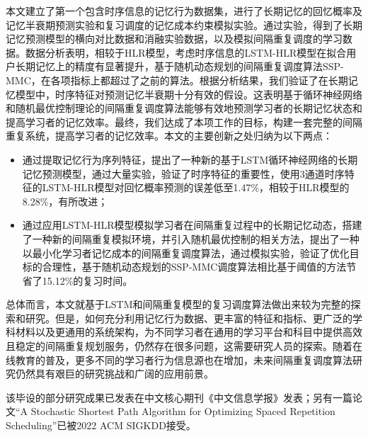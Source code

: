 \begin{conclusions}
本文建立了第一个包含时序信息的记忆行为数据集，进行了长期记忆的回忆概率及记忆半衰期预测实验和复习调度的记忆成本约束模拟实验。通过实验，得到了长期记忆预测模型的横向对比数据和消融实验数据，以及模拟间隔重复调度的学习数据。数据分析表明，相较于HLR模型，考虑时序信息的LSTM-HLR模型在拟合用户长期记忆上的精度有显著提升，基于随机动态规划的间隔重复调度算法SSP-MMC，在各项指标上都超过了之前的算法。根据分析结果，我们验证了在长期记忆模型中，时序特征对预测记忆半衰期十分有效的假设。这表明基于循环神经网络和随机最优控制理论的间隔重复调度算法能够有效地预测学习者的长期记忆状态和提高学习者的记忆效率。最终，我们达成了本项工作的目标，构建一套完整的间隔重复系统，提高学习者的记忆效率。本文的主要创新之处归纳为以下两点：
\begin{itemize}
    \item 通过提取记忆行为序列特征，提出了一种新的基于LSTM循环神经网络的长期记忆预测模型，通过大量实验，验证了时序特征的重要性，使用3通道时序特征的LSTM-HLR模型对回忆概率预测的误差低至1.47\%，相较于HLR模型的8.28\%，有所改进；
    \item 通过应用LSTM-HLR模型模拟学习者在间隔重复过程中的长期记忆动态，搭建了一种新的间隔重复模拟环境，并引入随机最优控制的相关方法，提出了一种以最小化学习者记忆成本的间隔重复调度算法，通过模拟实验，验证了优化目标的合理性，基于随机动态规划的SSP-MMC调度算法相比基于阈值的方法节省了15.12\%的复习时间。
\end{itemize}

总体而言，本文就基于LSTM和间隔重复模型的复习调度算法做出来较为完整的探索和研究。但是，如何充分利用记忆行为数据、更丰富的特征和指标、更广泛的学科材料以及更通用的系统架构，为不同学习者在通用的学习平台和科目中提供高效且稳定的间隔重复规划服务，仍然存在很多问题，这需要研究人员的探索。随着在线教育的普及，更多不同的学习者行为信息源也在增加，未来间隔重复调度算法研究仍然具有艰巨的研究挑战和广阔的应用前景。

该毕设的部分研究成果已发表在中文核心期刊《中文信息学报》发表；另有一篇论文“A Stochastic Shortest Path Algorithm for Optimizing Spaced Repetition Scheduling”已被2022 ACM SIGKDD接受。
\end{conclusions}
